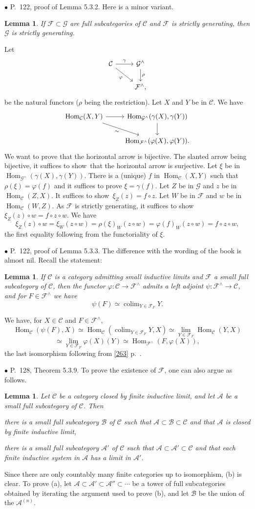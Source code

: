 \documentclass[12pt]{article}
\newtheorem{lem}[thm]{Lemma}
\theoremstyle{remark}%
\newcommand{\bu}{\bullet}
\newcommand{\n}{\noindent}
\newcommand{\A}{\mathcal A}
\newcommand{\B}{\mathcal B}
\newcommand{\C}{\mathcal C}
\newcommand{\F}{\mathcal F}
\newcommand{\G}{\mathcal G}
\newcommand{\p}{\varphi}
\newcommand{\pf}{\n{\em Proof. }}
\newcommand{\bl}{\begin{lem}}
\newcommand{\el}{\end{lem}}
\newcommand{\sts}{t suffices to show}
\DeclareMathOperator*{\co}{colim}
\DeclareMathOperator{\h}{Hom}
\begin{document}
\n$\bu$ P.~122, proof of Lemma 5.3.2. Here is a minor variant. 
%
\bl 
If $\F\subset\G$ are full subcategories of $\C$ and $\F$ is strictly generating, then $\G$ is strictly generating. 
\el 
%
\pf Let 
$$
\begin{tikzcd}
\C\ar{r}{\gamma}\ar{dr}[swap]{\p}&\G^\wedge\ar{d}{\rho}\\
&\F^\wedge,
\end{tikzcd}
$$ 
be the natural functors ($\rho$ being the restriction). Let $X$ and $Y$ be in $\C$. We have 
$$
\begin{tikzcd}
\h_\C(X,Y)\ar{r}\ar{dr}[swap]{\sim}&\h_{\G^\wedge}(\gamma(X),\gamma(Y))\ar{d}\\
&\h_{\F^\wedge}(\p(X),\p(Y)). 
\end{tikzcd}
$$ 
We want to prove that the horizontal arrow is bijective. The slanted arrow being bijective, i\sts\ that the horizontal arrow is surjective. Let $\xi$ be in $\h_{\G^\wedge}(\gamma(X),\gamma(Y))$. There is a (unique) $f$ in $\h_\C(X,Y)$ such that $\rho(\xi)=\p(f)$ and it suffices to prove $\xi=\gamma(f)$. Let $Z$ be in $\G$ and $z$ be in $\h_\C(Z,X)$. I\sts\ $\xi_Z(z)=f\circ z$. Let $W$ be in $\F$ and $w$ be in $\h_\C(W,Z)$. As $\F$ is strictly generating, i\sts\ $\xi_Z(z)\circ w=f\circ z\circ w$. We have 
$$
\xi_Z(z)\circ w=\xi_W(z\circ w)=\rho(\xi)_W(z\circ w)=\p(f)_W(z\circ w)
=f\circ z\circ w, 
$$ 
the first equality following from the functoriality of $\xi$. 


\n$\bu$ P.~122, proof of Lemma 5.3.3. The difference with the wording of the book is almost nil. Recall the statement: 
% 
\bl
If $\C$ is a category admitting small inductive limits and $\F$ a small full subcategory of $\C$, then the functor $\p:\C\to\F^\wedge$ admits a left adjoint $\psi:\F^\wedge\to\C$, and for $F\in\F^\wedge$ we have 
$$
\psi(F)\simeq\co_{Y\in\F_F}Y. 
$$ 
\el 
% 
\pf We have, for $X\in\C$ and $F\in\F^\wedge$, 
$$
\h_\C(\psi(F),X)\simeq\h_\C\left(\co_{Y\in\F_F}Y,X\right)\simeq\lim_{Y\in\F_F}\h_\C(Y,X)
$$ 
$$
\simeq\lim_{Y\in\F_F}\p(X)(Y)\simeq\h_{\F^\wedge}(F,\p(X)),
$$ 
the last isomorphism following from \eqref{263} p.~\pageref{263}. 


\n$\bu$ P.~128, Theorem 5.3.9. To prove the existence of $\F$, one can also argue as follows. 
% 
\begin{lem} 
% 
Let $\C$ be a category closed by finite inductive limit, and let $\A$ be a small full subcategory of $\C$. Then 

\n{\em(a)} there is a small full subcategory $\B$ of $\C$ such that $\A\subset\B\subset \C$ and that $\A$ is closed by finite inductive limit, 

\n{\em(b)} there is a small full subcategory $\A'$ of $\C$ such that $\A\subset\A'\subset \C$ and that each finite inductive system in $\A$ has a limit in $\A'$. 
%
\end{lem} 
% 
\n{\em Proof.} Since there are only countably many finite categories up to isomorphism, (b) is clear. To prove (a), let $\A\subset\A'\subset\A''\subset\cdots$ be a tower of full subcategories obtained by iterating the argument used to prove (b), and let $\B$ be the union of the $\A^{(n)}$. 
\end{document}
